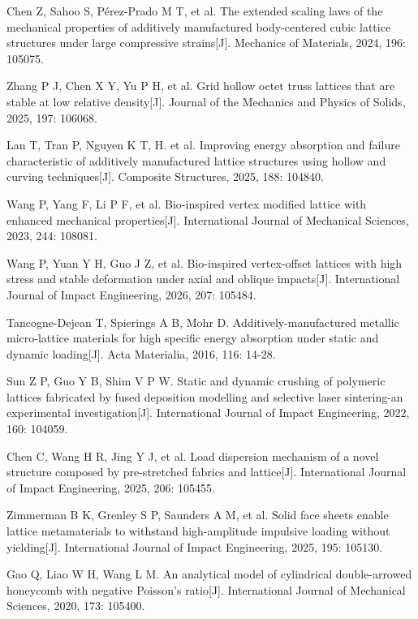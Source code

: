 \documentclass{article} %
\begin{document}
\noindent [35] Chen Z, Sahoo S, P\'{e}rez-Prado M T, et al. The extended scaling laws of the mechanical properties of additively manufactured body-centered cubic lattice structures under large compressive strains[J]. Mechanics of Materials, 2024, 196: 105075.

\noindent [36] Zhang P J, Chen X Y, Yu P H, et al. Grid hollow octet truss lattices that are stable at low relative density[J]. Journal of the Mechanics and Physics of Solids, 2025, 197: 106068.

\noindent [37] Lan T, Tran P, Nguyen K T, H. et al. Improving energy absorption and failure characteristic of additively manufactured lattice structures using hollow and curving techniques[J]. Composite Structures, 2025, 188: 104840.

\noindent [38] Wang P, Yang F, Li P F, et al. Bio-inspired vertex modified lattice with enhanced mechanical properties[J]. International Journal of Mechanical Sciences, 2023, 244: 108081.

\noindent [39] Wang P, Yuan Y H, Guo J Z, et al. Bio-inspired vertex-offset lattices with high stress and stable deformation under axial and oblique impacts[J]. International Journal of Impact Engineering, 2026, 207: 105484.

\noindent [40] Tancogne-Dejean T, Spierings A B, Mohr D. Additively-manufactured metallic micro-lattice materials for high specific energy absorption under static and dynamic loading[J]. Acta Materialia, 2016, 116: 14-28.

\noindent [41] Sun Z P, Guo Y B, Shim V P W. Static and dynamic crushing of polymeric lattices fabricated by fused deposition modelling and selective laser sintering-an experimental investigation[J]. International Journal of Impact Engineering, 2022, 160: 104059.

\noindent [42] Chen C, Wang H R, Jing Y J, et al. Load dispersion mechanism of a novel structure composed by pre-stretched fabrics and lattice[J]. International Journal of Impact Engineering, 2025, 206: 105455.

\noindent [43] Zimmerman B K, Grenley S P, Saunders A M, et al. Solid face sheets enable lattice metamaterials to withstand high-amplitude impulsive loading without yielding[J]. International Journal of Impact Engineering, 2025, 195: 105130.

\noindent [44] Gao Q, Liao W H, Wang L M. An analytical model of cylindrical double-arrowed honeycomb with negative Poisson's ratio[J]. International Journal of Mechanical Sciences, 2020, 173: 105400.
\end{document}
